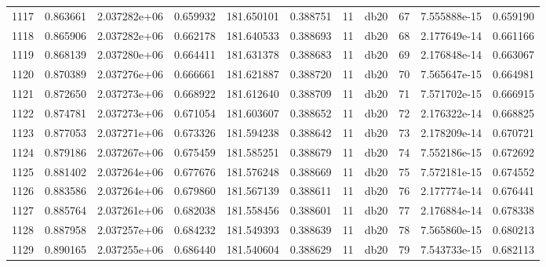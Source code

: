 \begin{tabular}{lrrrrrrlrrr}
1117 &    0.863661 &        2.037282e+06 &  0.659932 &              181.650101 &    0.388751 &      11 &         db20 &     67 &   7.555888e-15 &      0.659190 \\
1118 &    0.865906 &        2.037282e+06 &  0.662178 &              181.640533 &    0.388693 &      11 &         db20 &     68 &   2.177649e-14 &      0.661166 \\
1119 &    0.868139 &        2.037280e+06 &  0.664411 &              181.631378 &    0.388683 &      11 &         db20 &     69 &   2.176848e-14 &      0.663067 \\
1120 &    0.870389 &        2.037276e+06 &  0.666661 &              181.621887 &    0.388720 &      11 &         db20 &     70 &   7.565647e-15 &      0.664981 \\
1121 &    0.872650 &        2.037273e+06 &  0.668922 &              181.612640 &    0.388709 &      11 &         db20 &     71 &   7.571702e-15 &      0.666915 \\
1122 &    0.874781 &        2.037273e+06 &  0.671054 &              181.603607 &    0.388652 &      11 &         db20 &     72 &   2.176322e-14 &      0.668825 \\
1123 &    0.877053 &        2.037271e+06 &  0.673326 &              181.594238 &    0.388642 &      11 &         db20 &     73 &   2.178209e-14 &      0.670721 \\
1124 &    0.879186 &        2.037267e+06 &  0.675459 &              181.585251 &    0.388679 &      11 &         db20 &     74 &   7.552186e-15 &      0.672692 \\
1125 &    0.881402 &        2.037264e+06 &  0.677676 &              181.576248 &    0.388669 &      11 &         db20 &     75 &   7.572181e-15 &      0.674552 \\
1126 &    0.883586 &        2.037264e+06 &  0.679860 &              181.567139 &    0.388611 &      11 &         db20 &     76 &   2.177774e-14 &      0.676441 \\
1127 &    0.885764 &        2.037261e+06 &  0.682038 &              181.558456 &    0.388601 &      11 &         db20 &     77 &   2.176884e-14 &      0.678338 \\
1128 &    0.887958 &        2.037257e+06 &  0.684232 &              181.549393 &    0.388639 &      11 &         db20 &     78 &   7.565860e-15 &      0.680213 \\
1129 &    0.890165 &        2.037255e+06 &  0.686440 &              181.540604 &    0.388629 &      11 &         db20 &     79 &   7.543733e-15 &      0.682113 \\

\end{tabular}
